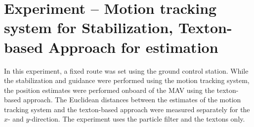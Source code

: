 \section{Experiment -- Motion tracking system for Stabilization, Texton-based Approach for estimation}
\label{sec:experiment4}

In this experiment, a fixed route was set using the ground control
station. While the stabilization and guidance were performed using
the motion tracking system, the position estimates were performed onboard
of the MAV using the texton-based approach. The Euclidean distances between the estimates of the motion tracking system and the texton-based approach
were measured separately for the $x$- and $y$-direction. The experiment uses the
particle filter and the textons only.